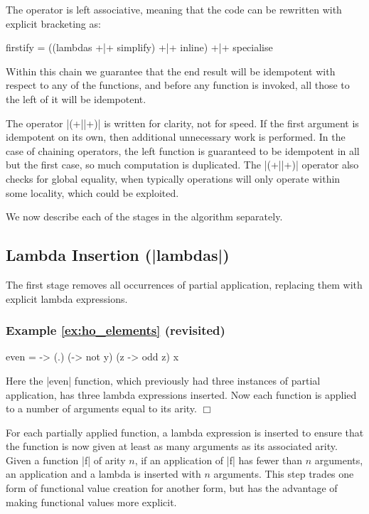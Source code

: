 \documentclass[preprint]{sigplanconf}
\newenvironment{exampleany}[1]
    {\subsubsection*{Example #1}}
    {\hfill$\Box$}
\newenvironment{examplerevisit}[1]
    {\begin{exampleany}{#1 (revisited)}}
    {\end{exampleany}}
\begin{document}
The operator is left associative, meaning that the code can be rewritten with explicit bracketing as:

\begin{code}
firstify = ((lambdas +|+ simplify) +|+ inline) +|+ specialise
\end{code}

Within this chain we guarantee that the end result will be idempotent with respect to any of the functions, and before any function is invoked, all those to the left of it will be idempotent.

The operator |(+||+)| is written for clarity, not for speed. If the first argument is idempotent on its own, then additional unnecessary work is performed. In the case of chaining operators, the left function is guaranteed to be idempotent in all but the first case, so much computation is duplicated. The |(+||+)| operator also checks for global equality, when typically operations will only operate within some locality, which could be exploited.

We now describe each of the stages in the algorithm separately.

\subsection{Lambda Insertion (|lambdas|)}

The first stage removes all occurrences of partial application, replacing them with explicit lambda expressions.

\begin{examplerevisit}{\ref{ex:ho_elements}}
\begin{code}
even = \x -> (.) (\y -> not y) (z -> odd z) x
\end{code}

Here the |even| function, which previously had three instances of partial application, has three lambda expressions inserted. Now each function is applied to a number of arguments equal to its arity.
\end{examplerevisit}

For each partially applied function, a lambda expression is inserted to ensure that the function is now given at least as many arguments as its associated arity. Given a function |f| of arity $n$, if an application of |f| has fewer than $n$ arguments, an application and a lambda is inserted with $n$ arguments. This step trades one form of functional value creation for another form, but has the advantage of making functional values more explicit.
\end{document}
